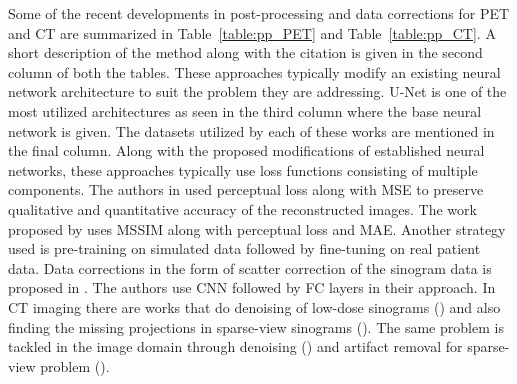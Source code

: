 Some of the recent developments in post-processing and data corrections for \ac{PET} and \ac{CT} are summarized in Table~\ref{table:pp_PET} and Table~\ref{table:pp_CT}. A short description of the method along with the citation is given in the second column of both the tables. These approaches typically modify an existing neural network architecture to suit the problem they are addressing. U-Net is one of the most utilized architectures as seen in the third column where the base neural network is given. The datasets utilized by each of these works are mentioned in the final column. Along with the proposed modifications of established neural networks, these approaches typically use loss functions consisting of multiple components. The authors in \cite{gong2018pet} used perceptual loss along with \ac{MSE} to preserve qualitative and quantitative accuracy of the reconstructed images. The work proposed by \cite{whiteley2020fastpet} uses \ac{MSSIM} along with perceptual loss and \ac{MAE}. Another strategy used is pre-training on simulated data followed by fine-tuning on real patient data. Data corrections in the form of scatter correction of the sinogram data is proposed in \cite{qian2017deep}. The authors use \ac{CNN} followed by \ac{FC} layers in their approach. In \ac{CT} imaging there are works that do denoising of low-dose sinograms (\cite{zhu2020low,ma2021sinogram}) and also finding the missing projections in sparse-view sinograms (\cite{lee2018deep}). The same problem is tackled in the image domain through denoising (\cite{yang2018low}) and artifact removal for sparse-view problem (\cite{jin2017deep,xie2018artifact,zhang2018sparse}).
